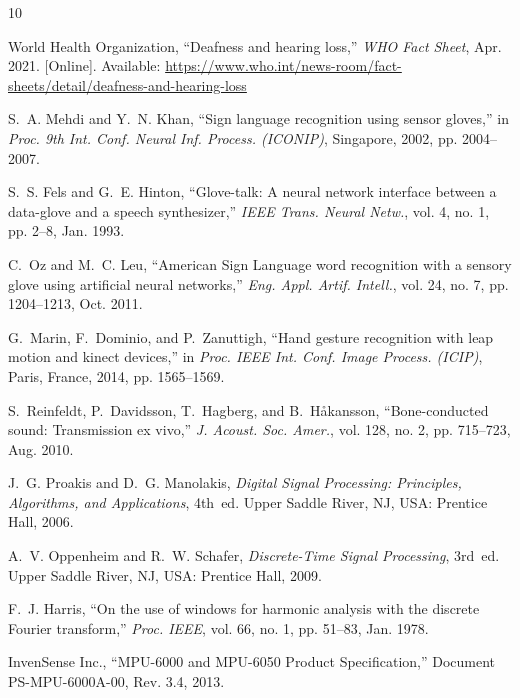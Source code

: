 \documentclass[conference]{IEEEtran}
\begin{document}
\begin{thebibliography}{10}

World Health Organization, ``Deafness and hearing loss,'' \textit{WHO Fact Sheet}, Apr. 2021. [Online]. Available: \url{https://www.who.int/news-room/fact-sheets/detail/deafness-and-hearing-loss}

S.~A. Mehdi and Y.~N. Khan, ``Sign language recognition using sensor gloves,'' in \textit{Proc. 9th Int. Conf. Neural Inf. Process. (ICONIP)}, Singapore, 2002, pp. 2004--2007.

S.~S. Fels and G.~E. Hinton, ``Glove-talk: A neural network interface between a data-glove and a speech synthesizer,'' \textit{IEEE Trans. Neural Netw.}, vol. 4, no. 1, pp. 2--8, Jan. 1993.

C.~Oz and M.~C. Leu, ``American Sign Language word recognition with a sensory glove using artificial neural networks,'' \textit{Eng. Appl. Artif. Intell.}, vol. 24, no. 7, pp. 1204--1213, Oct. 2011.

G.~Marin, F.~Dominio, and P.~Zanuttigh, ``Hand gesture recognition with leap motion and kinect devices,'' in \textit{Proc. IEEE Int. Conf. Image Process. (ICIP)}, Paris, France, 2014, pp. 1565--1569.

S.~Reinfeldt, P.~Davidsson, T.~Hagberg, and B.~H\aa{}kansson, ``Bone-conducted sound: Transmission ex vivo,'' \textit{J. Acoust. Soc. Amer.}, vol. 128, no. 2, pp. 715--723, Aug. 2010.

J.~G. Proakis and D.~G. Manolakis, \textit{Digital Signal Processing: Principles, Algorithms, and Applications}, 4th~ed. Upper Saddle River, NJ, USA: Prentice Hall, 2006.

A.~V. Oppenheim and R.~W. Schafer, \textit{Discrete-Time Signal Processing}, 3rd~ed. Upper Saddle River, NJ, USA: Prentice Hall, 2009.

F.~J. Harris, ``On the use of windows for harmonic analysis with the discrete Fourier transform,'' \textit{Proc. IEEE}, vol. 66, no. 1, pp. 51--83, Jan. 1978.

InvenSense Inc., ``MPU-6000 and MPU-6050 Product Specification,'' Document PS-MPU-6000A-00, Rev. 3.4, 2013.

\end{thebibliography}
\end{document}
